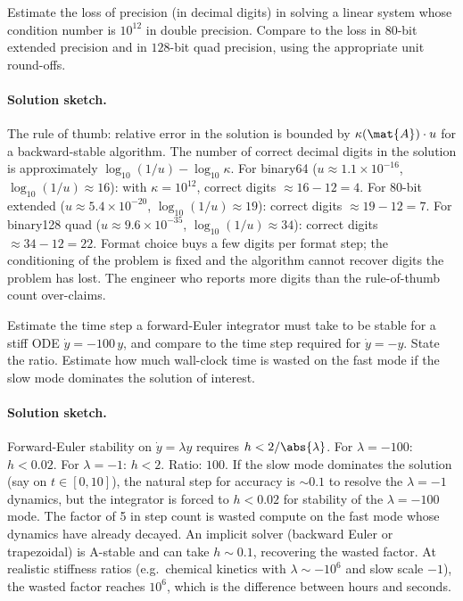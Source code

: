 \begin{exercise}
Estimate the loss of precision (in decimal digits) in solving a
linear system whose condition number is $10^{12}$ in double
precision. Compare to the loss in $80$-bit extended precision and
in $128$-bit quad precision, using the appropriate unit round-offs.
\end{exercise}

\paragraph{Solution sketch.}
The rule of thumb: relative error in the solution is bounded by
$\kappa(\mat{A}) \cdot u$ for a backward-stable algorithm. The
number of correct decimal digits in the solution is approximately
$\log_{10}(1/u) - \log_{10} \kappa$. For binary64 ($u
\approx 1.1 \times 10^{-16}$, $\log_{10}(1/u) \approx 16$): with
$\kappa = 10^{12}$, correct digits $\approx 16 - 12 = 4$. For
80-bit extended ($u \approx 5.4 \times 10^{-20}$, $\log_{10}(1/u)
\approx 19$): correct digits $\approx 19 - 12 = 7$. For binary128
quad ($u \approx 9.6 \times 10^{-35}$, $\log_{10}(1/u) \approx 34$):
correct digits $\approx 34 - 12 = 22$. Format choice buys a few
digits per format step; the conditioning of the problem is fixed
and the algorithm cannot recover digits the problem has lost. The
engineer who reports more digits than the rule-of-thumb count
over-claims.

\begin{exercise}
Estimate the time step a forward-Euler integrator must take to be
stable for a stiff ODE $\dot{y} = -100\,y$, and compare to the
time step required for $\dot{y} = -y$. State the ratio. Estimate
how much wall-clock time is wasted on the fast mode if the slow
mode dominates the solution of interest.
\end{exercise}

\paragraph{Solution sketch.}
Forward-Euler stability on $\dot y = \lambda y$ requires
$h < 2/\abs{\lambda}$. For $\lambda = -100$: $h < 0.02$. For
$\lambda = -1$: $h < 2$. Ratio: $100$. If the slow mode dominates
the solution (say on $t \in [0, 10]$), the natural step for
accuracy is $\sim 0.1$ to resolve the $\lambda = -1$ dynamics,
but the integrator is forced to $h < 0.02$ for stability of the
$\lambda = -100$ mode. The factor of 5 in step count is wasted
compute on the fast mode whose dynamics have already decayed.
An implicit solver (backward Euler or trapezoidal) is A-stable
and can take $h \sim 0.1$, recovering the wasted factor.
At realistic stiffness ratios (e.g.\ chemical kinetics with
$\lambda \sim -10^{6}$ and slow scale $-1$), the wasted factor
reaches $10^{6}$, which is the difference between hours and
seconds.

